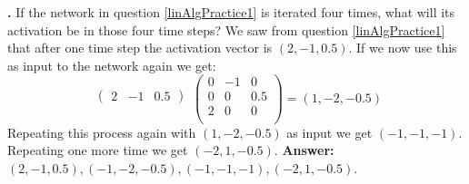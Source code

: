 \noindent
{}
{\bf \theLinearAlgebraCounter.}  If the network in question \ref{linAlgPractice1} is iterated four times, what will its activation be in those four time steps?
We saw from question \ref{linAlgPractice1} that after one time step the activation vector is $(2,-1,0.5)$. If we now use this as input to the network again we get:
\[
  \begin{matrix}
  \begin{pmatrix}2 & -1 & 0.5
  \end{pmatrix}\\\mbox{}
 \end{matrix}
 \begin{pmatrix}
 0  &   -1 & 0 \\
 0  &   0 & 0.5 \\
 2  &   0 & 0 \\
\end{pmatrix}
  =  (1,-2,-0.5)
\]
Repeating this process again with $(1,-2,-0.5)$ as input we get $(-1,-1,-1)$. Repeating one more time we get $(-2,1,-0.5)$.
{\bf Answer:}  $(2,-1,0.5),(-1,-2,-0.5),(-1,-1,-1),(-2,1,-0.5)$.
\bigskip
